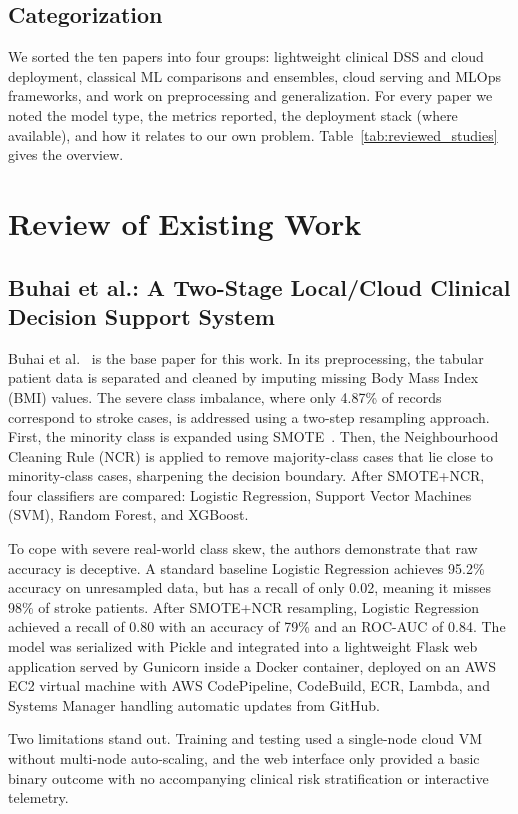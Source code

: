 \documentclass[10pt,twocolumn,a4paper]{article}
\begin{document}
\subsection{Categorization}
We sorted the ten papers into four groups: lightweight clinical DSS and cloud deployment, classical ML comparisons and ensembles, cloud serving and MLOps frameworks, and work on preprocessing and generalization. For every paper we noted the model type, the metrics reported, the deployment stack (where available), and how it relates to our own problem. Table~\ref{tab:reviewed_studies} gives the overview.

\section{Review of Existing Work}

\subsection{Buhai et al.: A Two-Stage Local/Cloud Clinical Decision Support System}
Buhai et al.~\cite{buhai2026} is the base paper for this work. In its preprocessing, the tabular patient data is separated and cleaned by imputing missing Body Mass Index (BMI) values. The severe class imbalance, where only 4.87\% of records correspond to stroke cases, is addressed using a two-step resampling approach. First, the minority class is expanded using SMOTE~\cite{chawla2002}. Then, the Neighbourhood Cleaning Rule (NCR) is applied to remove majority-class cases that lie close to minority-class cases, sharpening the decision boundary. After SMOTE+NCR, four classifiers are compared: Logistic Regression, Support Vector Machines (SVM), Random Forest, and XGBoost.

To cope with severe real-world class skew, the authors demonstrate that raw accuracy is deceptive. A standard baseline Logistic Regression achieves 95.2\% accuracy on unresampled data, but has a recall of only 0.02, meaning it misses 98\% of stroke patients. After SMOTE+NCR resampling, Logistic Regression achieved a recall of 0.80 with an accuracy of 79\% and an ROC-AUC of 0.84. The model was serialized with Pickle and integrated into a lightweight Flask web application served by Gunicorn inside a Docker container, deployed on an AWS EC2 virtual machine with AWS CodePipeline, CodeBuild, ECR, Lambda, and Systems Manager handling automatic updates from GitHub.

Two limitations stand out. Training and testing used a single-node cloud VM without multi-node auto-scaling, and the web interface only provided a basic binary outcome with no accompanying clinical risk stratification or interactive telemetry.
\end{document}
